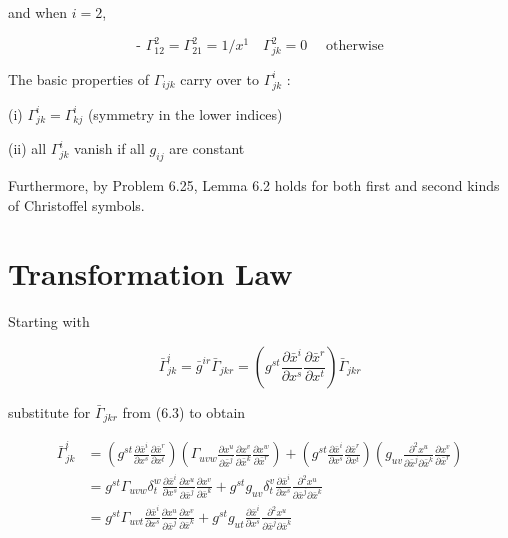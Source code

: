\documentclass[10pt]{article}
\begin{document}
and when $i=2$,

$$
\text { - } \Gamma_{12}^{2}=\Gamma_{21}^{2}=1 / x^{1} \quad \Gamma_{j k}^{2}=0 \quad \text { otherwise }
$$

The basic properties of $\Gamma_{i j k}$ carry over to $\Gamma_{j k}^{i}$ :

(i) $\Gamma_{j k}^{i}=\Gamma_{k j}^{i}$ (symmetry in the lower indices)

(ii) all $\Gamma_{j k}^{i}$ vanish if all $g_{i j}$ are constant

Furthermore, by Problem 6.25, Lemma 6.2 holds for both first and second kinds of Christoffel symbols.

\section*{Transformation Law}
Starting with

$$
\bar{\Gamma}_{j k}^{i}=\bar{g}^{i r} \bar{\Gamma}_{j k r}=\left(g^{s t} \frac{\partial \bar{x}^{i}}{\partial x^{s}} \frac{\partial \bar{x}^{r}}{\partial x^{t}}\right) \bar{\Gamma}_{j k r}
$$

substitute for $\bar{\Gamma}_{j k r}$ from (6.3) to obtain

$$
\begin{aligned}
\bar{\Gamma}_{j k}^{i} & =\left(g^{s t} \frac{\partial \bar{x}^{i}}{\partial x^{s}} \frac{\partial \bar{x}^{r}}{\partial x^{t}}\right)\left(\Gamma_{u v w} \frac{\partial x^{u}}{\partial \bar{x}^{j}} \frac{\partial x^{v}}{\partial \bar{x}^{k}} \frac{\partial x^{w}}{\partial \bar{x}^{r}}\right)+\left(g^{s t} \frac{\partial \bar{x}^{i}}{\partial x^{s}} \frac{\partial \bar{x}^{r}}{\partial x^{t}}\right)\left(g_{u v} \frac{\partial^{2} x^{u}}{\partial \bar{x}^{j} \partial \bar{x}^{k}} \frac{\partial x^{v}}{\partial \bar{x}^{r}}\right) \\
& =g^{s t} \Gamma_{u v w} \delta_{t}^{w} \frac{\partial \bar{x}^{i}}{\partial x^{s}} \frac{\partial x^{u}}{\partial \bar{x}^{j}} \frac{\partial x^{v}}{\partial \bar{x}^{k}}+g^{s t} g_{u v} \delta_{t}^{v} \frac{\partial \bar{x}^{i}}{\partial x^{s}} \frac{\partial^{2} x^{u}}{\partial \bar{x}^{j} \partial \bar{x}^{k}} \\
& =g^{s t} \Gamma_{u v t} \frac{\partial \bar{x}^{i}}{\partial x^{s}} \frac{\partial x^{u}}{\partial \bar{x}^{j}} \frac{\partial x^{v}}{\partial \bar{x}^{k}}+g^{s t} g_{u t} \frac{\partial \bar{x}^{i}}{\partial x^{s}} \frac{\partial^{2} x^{u}}{\partial \bar{x}^{j} \partial \bar{x}^{k}}
\end{aligned}
$$
\end{document}
